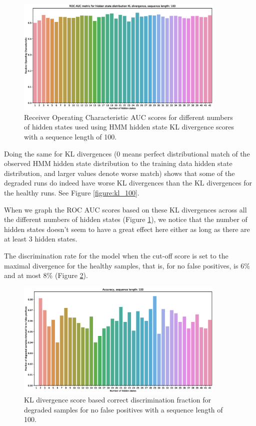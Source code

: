\documentclass[journal]{IEEEtran}
\begin{document}
\begin{figure}[tb]
 \centering
 \includegraphics[width=10cm,keepaspectratio=true]{./roc_kl_score_100.eps}
 \caption{Receiver Operating Characteristic AUC scores for different numbers of hidden states used using HMM hidden state KL divergence scores with a sequence length of 100.}
 \label{figure:roc_kl_100}
\end{figure}

Doing the same for KL divergences (0 means perfect distributional match of the observed HMM hidden state distribution to the training data hidden state distribution, and larger values denote worse match) shows that some of the degraded runs do indeed have worse KL divergences than the KL divergences for the healthy runs. See Figure \ref{figure:kl_100}.

When we graph the ROC AUC scores based on these KL divergences across all the different numbers of hidden states (Figure \ref{figure:roc_kl_100}), we notice that the number of hidden states doesn't seem to have a great effect here either as long as there are at least 3 hidden states.

The discrimination rate for the model when the cut-off score is set to the maximal divergence for the healthy samples, that is, for no false positives, is 6\% and at most 8\% (Figure \ref{figure:discrimination_rate_100}).

\begin{figure}[tb]
 \centering
 \includegraphics[width=10cm,keepaspectratio=true]{./accuracy_100.eps}
 \caption{KL divergence score based correct discrimination fraction for degraded samples for no false positives with a sequence length of 100.}
 \label{figure:discrimination_rate_100}
\end{figure}
\end{document}
